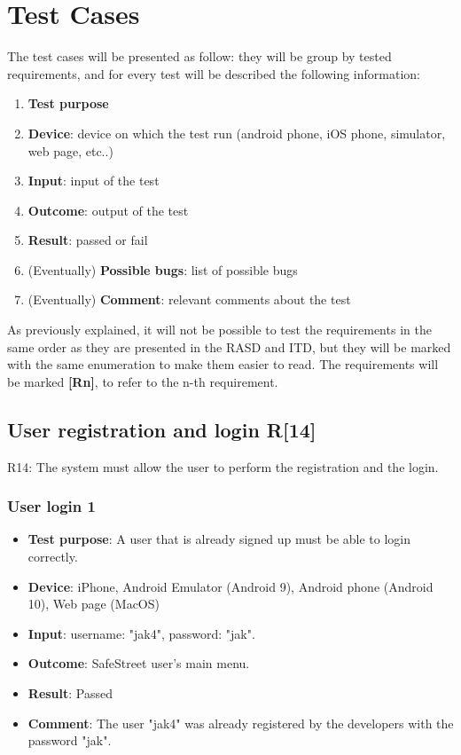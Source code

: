 \documentclass[../ATD.tex]{subfiles}
\begin{document}
    \section{Test Cases}\label{sec:test-cases}
    The test cases will be presented as follow: they will be group by tested requirements, and for every test will be described the following information:
    \begin{enumerate}
        \item \textbf{Test purpose}
        \item \textbf{Device}: device on which the test run (android phone, iOS phone, simulator, web page, etc..)
        \item \textbf{Input}: input of the test
        \item \textbf{Outcome}: output of the test
        \item \textbf{Result}: passed or fail
        \item (Eventually) \textbf{Possible bugs}: list of possible bugs
        \item (Eventually) \textbf{Comment}: relevant comments about the test
    \end{enumerate}
    As previously explained, it will not be possible to test the requirements in the same order as they are presented in the RASD and ITD,
    but they will be marked with the same enumeration to make them easier to read.
    The requirements will be marked \textbf{[Rn]}, to refer to the n-th requirement.

    \subsection{User registration and login R[14]}\label{subsec:user-registration-and-login}
    R14: The system must allow the user to perform the registration and the login.

    \subsubsection{User login 1}\label{subsubsec:user-login-1}
    \begin{itemize}
        \item \textbf{Test purpose}: A user that is already signed up must be able to login correctly.
        \item \textbf{Device}: iPhone, Android Emulator (Android 9), Android phone (Android 10), Web page (MacOS)
        \item \textbf{Input}: username: "jak4", password: "jak".
        \item \textbf{Outcome}: SafeStreet user's main menu.
        \item \textbf{Result}: Passed
        \item \textbf{Comment}: The user "jak4" was already registered by the developers with the password "jak".
    \end{itemize}
\end{document}
